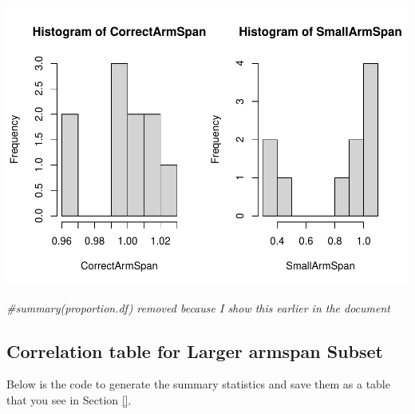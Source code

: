 \documentclass[]{article}
\newenvironment{Shaded}{\begin{snugshade}}{\end{snugshade}}
\newcommand{\CommentTok}[1]{\textcolor[rgb]{0.56,0.35,0.01}{\textit{#1}}}
\newcommand{\DataTypeTok}[1]{\textcolor[rgb]{0.13,0.29,0.53}{#1}}
\newcommand{\DecValTok}[1]{\textcolor[rgb]{0.00,0.00,0.81}{#1}}
\newcommand{\KeywordTok}[1]{\textcolor[rgb]{0.13,0.29,0.53}{\textbf{#1}}}
\newcommand{\NormalTok}[1]{#1}
\newcommand{\OperatorTok}[1]{\textcolor[rgb]{0.81,0.36,0.00}{\textbf{#1}}}
\newcommand{\StringTok}[1]{\textcolor[rgb]{0.31,0.60,0.02}{#1}}
\begin{document}
\begin{Shaded}
\end{Shaded}

\includegraphics{project-measure-writeup_files/figure-latex/proportion-plots-4.pdf}

\begin{Shaded}
\begin{Highlighting}[]
\CommentTok{\#summary(proportion.df) removed because I show this earlier in the document}
\end{Highlighting}
\end{Shaded}

\subsection{Correlation table for Larger armspan Subset}
\label{sec:Large- correlation-tables}


Below is the code to generate the summary statistics and save them as a
table that you see in Section \ref{}.
\end{document}
